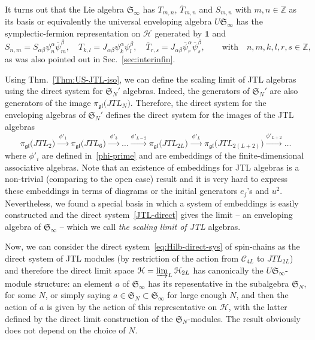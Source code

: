 \documentclass[11pt]{article}
\newcommand{\one}{\boldsymbol{1}}%
\newcommand{\strt}{T}
\newcommand{\bstrt}{\bar{\strt}}
\newcommand{\JTL}[1]{JTL_{#1}}
\newcommand{\sferm}{\psi}
\newcommand{\bsferm}{\bar{\psi}}
\newcommand{\Hilb}{\mathcal{H}}
\newcommand{\oZ}{\mathbb{Z}}
\newcommand{\interLie}{\mathfrak{S}}
\newcommand{\interfin}[1]{\interLie_{#1}}
\newcommand{\Clif}[1]{\mathscr{C}_{#1}}
\newcommand{\interinfin}{\interLie_{\infty}}
\newcommand{\gl}{\mathfrak{gl}}
\newcommand{\repgl}{\pi_{\gl}}
\newcommand{\enrg}{S}
\theoremstyle{definition}
\begin{document}
It turns out that the  Lie algebra $\interinfin$ has $\strt_{m,n}$, $\bstrt_{m,n}$ and $\enrg_{m,n}$ with $m,n\in\oZ$ as its basis or equivalently the universal enveloping algebra $U\interinfin$ has the symplectic-fermion representation
on $\Hilb$ generated by $\one$ and
\begin{equation}\label{app:sympl-ferm-interLie}
\enrg_{n,m} = S_{\alpha\beta} \psi^{\alpha}_n \bar{\psi}^{\beta}_m,\quad
\strt_{k,l}=J_{\alpha\beta}{\sferm^{\alpha}_{k}\sferm^{\beta}_{l}},\quad \bstrt_{r,s}=J_{\alpha\beta}{\bsferm^{\alpha}_{r}\bsferm^{\beta}_{s}}, \qquad\text{with}\quad n,m,k,l,r,s\in\oZ,
\end{equation}
as was also pointed out in Sec.~\ref{sec:interinfin}.


 Using Thm.~\ref{Thm:US-JTL-iso}, we can  define the scaling limit of JTL algebras using the direct system for  $\interfin{N}'$ algebras.
  Indeed, the generators of $\interfin{N}'$ are also generators of the image $\repgl\bigl(\JTL{N}\bigr)$. Therefore, the direct system for the enveloping algebras of $\interfin{N}'$ defines the direct system for the images of the JTL algebras
\begin{equation}\label{JTL-direct}
\repgl\bigl(\JTL{2}\bigr)\xrightarrow{\;\phi'_1\;}\repgl\bigl(\JTL{6}\bigr)\xrightarrow{\;\phi'_3\;}\dots\xrightarrow{\phi'_{L-2}}
\repgl\bigl(\JTL{2L}\bigr)\xrightarrow{\;\phi'_{L}\;}\repgl\bigl(\JTL{2(L+2)}\bigr)\xrightarrow{\phi'_{L+2}}\dots
\end{equation}
where $\phi'_i$ are defined in~\eqref{phi-prime} and are embeddings of the finite-dimensional associative algebras.
Note that an existence of embeddings for JTL algebras is a non-trivial (comparing to the open case) result and it is very hard to express these embeddings in terms of diagrams or the initial generators $e_j$'s and $u^2$.
Nevertheless, we found a special basis in which a system of embeddings is easily constructed and the direct system~\eqref{JTL-direct} gives the limit -- an enveloping algebra of $\interinfin$ --  which we call  \textit{the scaling limit of JTL} algebras.

Now, we can consider the direct system~\eqref{eq:Hilb-direct-sys} of spin-chains as the direct system of JTL modules (by restriction of the action from $\Clif{4L}$ to $\JTL{2L}$) and therefore the direct limit space $\Hilb=\varinjlim_L \Hilb_{2L}$ has canonically the $U\interinfin$-module structure: an element $a$ of $\interinfin$ has its repesentative in the subalgebra $\interfin{N}$,  for some $N$, or simply saying $a\in\interfin{N}\subset\interinfin$ for large enough $N$, and then the action of $a$ is given by the action of this representative on $\Hilb$, with the latter defined by the direct limit construction of the $\interfin{N}$-modules. The result obviously does not depend on the choice of $N$.
\end{document}
